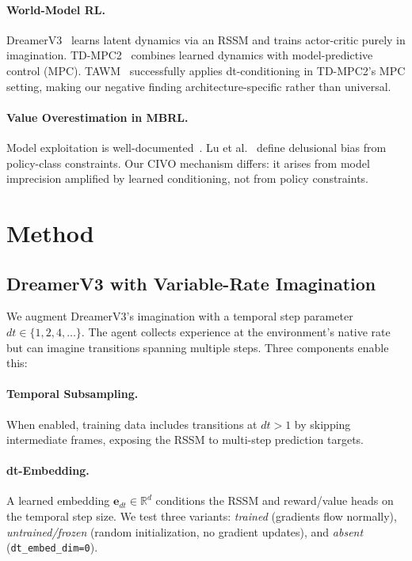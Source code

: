 \documentclass[letterpaper]{article}
\begin{document}
\paragraph{World-Model RL.}
DreamerV3~\cite{hafner2023dreamerv3} learns latent dynamics via an RSSM and trains actor-critic purely in imagination.
TD-MPC2~\cite{hansen2024tdmpc2} combines learned dynamics with model-predictive control (MPC).
TAWM~\cite{nhu2025tawm} successfully applies dt-conditioning in TD-MPC2's MPC setting, making our negative finding architecture-specific rather than universal.

\paragraph{Value Overestimation in MBRL.}
Model exploitation is well-documented~\cite{janner2019mbpo}.
Lu et al.~\cite{lu2018nondelusional} define delusional bias from policy-class constraints.
Our CIVO mechanism differs: it arises from model imprecision amplified by learned conditioning, not from policy constraints.

\section{Method}

\subsection{DreamerV3 with Variable-Rate Imagination}

We augment DreamerV3's imagination with a temporal step parameter $dt \in \{1, 2, 4, \ldots\}$.
The agent collects experience at the environment's native rate but can imagine transitions spanning multiple steps.
Three components enable this:

\paragraph{Temporal Subsampling.}
When enabled, training data includes transitions at $dt>1$ by skipping intermediate frames, exposing the RSSM to multi-step prediction targets.

\paragraph{dt-Embedding.}
A learned embedding $\mathbf{e}_{dt} \in \mathbb{R}^d$ conditions the RSSM and reward/value heads on the temporal step size.
We test three variants: \emph{trained} (gradients flow normally), \emph{untrained/frozen} (random initialization, no gradient updates), and \emph{absent} (\texttt{dt\_embed\_dim=0}).
\end{document}
